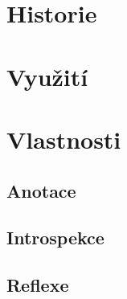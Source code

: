 \section{Historie}
\section{Využití}
\section{Vlastnosti}
\subsection{Anotace}
\subsection{Introspekce}
\subsection{Reflexe}
 
